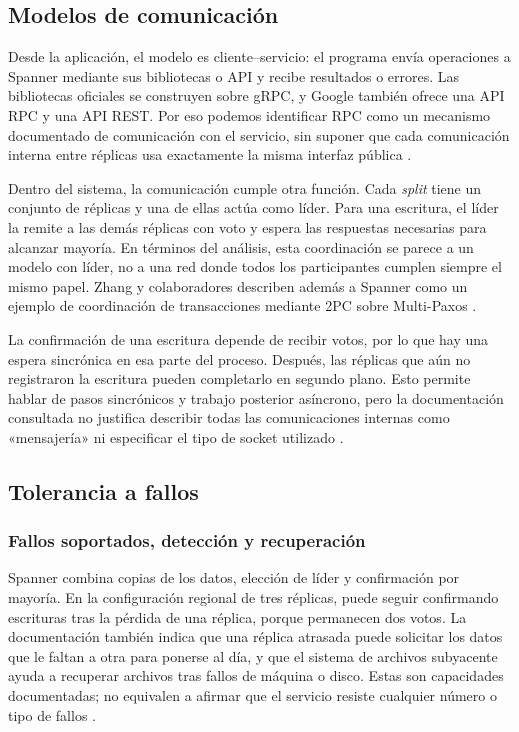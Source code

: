 \documentclass[11pt,a4paper]{article}
\begin{document}
\subsection{Modelos de comunicación}
Desde la aplicación, el modelo es cliente--servicio: el programa envía operaciones a Spanner mediante sus bibliotecas o API y recibe resultados o errores. Las bibliotecas oficiales se construyen sobre gRPC, y Google también ofrece una API RPC y una API REST. Por eso podemos identificar RPC como un mecanismo documentado de comunicación con el servicio, sin suponer que cada comunicación interna entre réplicas usa exactamente la misma interfaz pública \cite{GoogleSpannerAPIs}.

Dentro del sistema, la comunicación cumple otra función. Cada \emph{split} tiene un conjunto de réplicas y una de ellas actúa como líder. Para una escritura, el líder la remite a las demás réplicas con voto y espera las respuestas necesarias para alcanzar mayoría. En términos del análisis, esta coordinación se parece a un modelo con líder, no a una red donde todos los participantes cumplen siempre el mismo papel. Zhang y colaboradores describen además a Spanner como un ejemplo de coordinación de transacciones mediante 2PC sobre Multi-Paxos \cite{GoogleSpannerReplication,ZhangEtAl2024D2PC}.

La confirmación de una escritura depende de recibir votos, por lo que hay una espera sincrónica en esa parte del proceso. Después, las réplicas que aún no registraron la escritura pueden completarlo en segundo plano. Esto permite hablar de pasos sincrónicos y trabajo posterior asíncrono, pero la documentación consultada no justifica describir todas las comunicaciones internas como «mensajería» ni especificar el tipo de socket utilizado \cite{GoogleSpannerReplication}.

\subsection{Tolerancia a fallos}
\subsubsection{Fallos soportados, detección y recuperación}
Spanner combina copias de los datos, elección de líder y confirmación por mayoría. En la configuración regional de tres réplicas, puede seguir confirmando escrituras tras la pérdida de una réplica, porque permanecen dos votos. La documentación también indica que una réplica atrasada puede solicitar los datos que le faltan a otra para ponerse al día, y que el sistema de archivos subyacente ayuda a recuperar archivos tras fallos de máquina o disco. Estas son capacidades documentadas; no equivalen a afirmar que el servicio resiste cualquier número o tipo de fallos \cite{GoogleSpannerReplication}.
\end{document}
